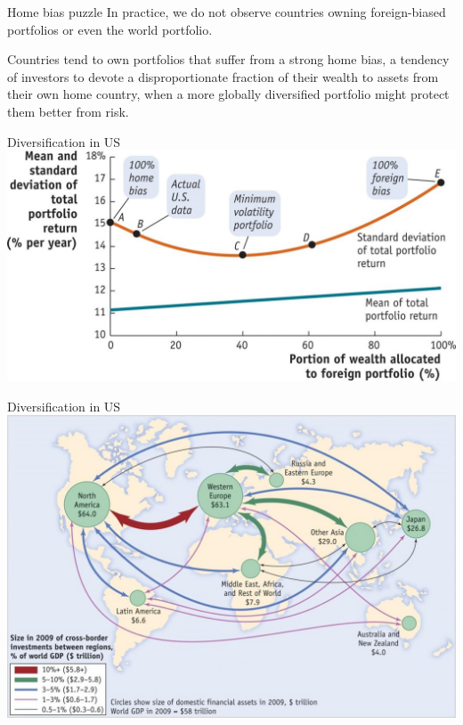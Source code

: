 \documentclass[
  ignorenonframetext,
]{beamer}
\begin{document}
\begin{frame}{Home bias puzzle}
\label{home-bias-puzzle}
In practice, we do not observe countries owning foreign-biased
portfolios or even the world portfolio.

Countries tend to own portfolios that suffer from a strong home bias, a
tendency of investors to devote a disproportionate fraction of their
wealth to assets from their own home country, when a more globally
diversified portfolio might protect them better from risk.
\end{frame}

\begin{frame}{Diversification in US}
\label{diversification-in-us}
\includegraphics{pic10.jpg}
\end{frame}

\begin{frame}{Diversification in US}
\label{diversification-in-us-1}
\includegraphics{pic11.jpg}
\end{frame}
\end{document}
